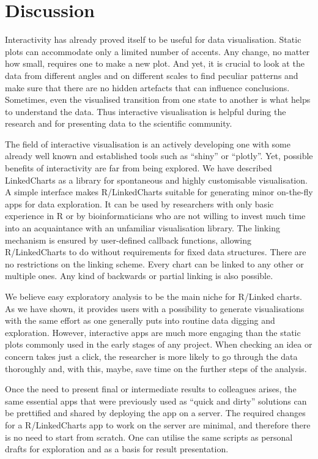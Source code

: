 \documentclass[twocolumn,10pt]{article}
\begin{document}
\section{Discussion}

Interactivity has already proved itself to be useful for data visualisation. Static plots can accommodate only a limited number of accents. Any change, no matter how small, requires one to make a new plot. And yet, it is crucial to look at the data from different angles and on different scales to find peculiar patterns and make sure that there are no hidden artefacts that can influence conclusions. Sometimes, even the visualised transition from one state to another is what helps to understand the data. Thus interactive visualisation is helpful during the research and for presenting data to the scientific community.

The field of interactive visualisation is an actively developing one with some already well known and established tools such as ``shiny'' \citep{shiny} or ``plotly''\citep{sievert_2020}. Yet, possible benefits of interactivity are far from being explored. We have described LinkedCharts as a library for spontaneous and highly customisable visualisation. A simple interface makes R/LinkedCharts suitable for generating minor on-the-fly apps for data exploration. It can be used by researchers with only basic experience in R or by bioinformaticians who are not willing to invest much time into an acquaintance with an unfamiliar visualisation library. The linking mechanism is ensured by user-defined callback functions, allowing R/LinkedCharts to do without requirements for fixed data structures. There are no restrictions on the linking scheme. Every chart can be linked to any other or multiple ones. Any kind of backwards or partial linking is also possible.

We believe easy exploratory analysis to be the main niche for R/Linked charts. As we have shown, it provides users with a possibility to generate visualisations with the same effort as one generally puts into routine data digging and exploration. However, interactive apps are much more engaging than the static plots commonly used in the early stages of any project. When checking an idea or concern takes just a click, the researcher is more likely to go through the data thoroughly and, with this, maybe, save time on the further steps of the analysis.

Once the need to present final or intermediate results to colleagues arises, the same essential apps that were previously used as ``quick and dirty'' solutions can be prettified and shared by deploying the app on a server. The required changes for a R/LinkedCharts app to work on the server are minimal, and therefore there is no need to start from scratch. One can utilise the same scripts as personal drafts for exploration and as a basis for result presentation.
\end{document}
